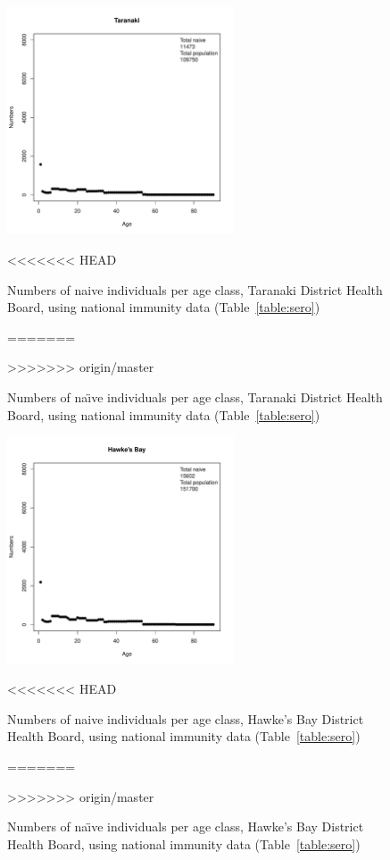 \documentclass{article}
\begin{document}
\begin{itemize}
\begin{figure}[H]
  \begin{center}
    \includegraphics[width=0.6\textwidth]{dhb9.pdf}
     \end{center}
<<<<<<< HEAD
     \caption{Numbers of naive individuals per age class, Taranaki District Health Board, using national immunity data (Table~\ref{table:sero})}
=======
     \caption{Numbers of na\"{\i}ve individuals per age class, Taranaki District Health Board, using national immunity data (Table~\ref{table:sero})}
>>>>>>> origin/master
     \label{fig:Taranaki}
\end{figure}

\begin{figure}[H]
     \begin{center}
     \includegraphics[width=0.6\textwidth]{dhb10.pdf}
     \end{center}
<<<<<<< HEAD
     \caption{Numbers of naive individuals per age class, Hawke's Bay District Health Board, using national immunity data (Table~\ref{table:sero})}
=======
     \caption{Numbers of na\"{\i}ve individuals per age class, Hawke's Bay District Health Board, using national immunity data (Table~\ref{table:sero})}
>>>>>>> origin/master
     \label{fig:HawkesBay}
\end{figure}


\end{itemize}
\end{document}
